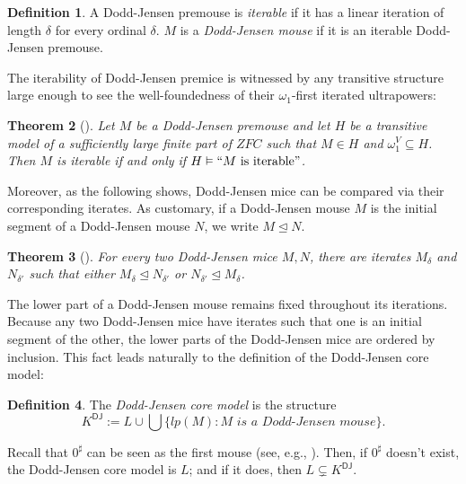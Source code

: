 \documentclass{amsart}
\numberwithin{equation}{section}
\newtheorem{theorem}{Theorem}[section]
\theoremstyle{definition}
\newtheorem{definition}[theorem]{Definition}
\theoremstyle{remark}
\begin{document}
\begin{definition}\label{definition:dj-mouse} A Dodd-Jensen premouse is \emph{iterable} if it has a linear iteration of length $\delta$ for every ordinal $\delta$. $M$ is a \emph{Dodd-Jensen mouse} if it is an iterable Dodd-Jensen premouse.
\end{definition}

The iterability of Dodd-Jensen premice is witnessed by any transitive structure large enough to see the well-foundedness of their $\omega_1$-first iterated ultrapowers:

\begin{theorem}[{\cite[Theorem 2.7]{koepke1988some}}]\label{theorem:iterability-iff-iterability-in-a-large-enough-transitive-model} Let $M$ be a Dodd-Jensen premouse and let $H$ be a transitive model of a sufficiently large finite part of $ZFC$ such that $M\in H$ and $\omega_{1}^{V}\subseteq H$. Then $M$ is iterable if and only if $H\vDash``M \text{ is iterable}"$.
\end{theorem} 

Moreover, as the following shows, Dodd-Jensen mice can be compared via their corresponding iterates. As customary, if a Dodd-Jensen mouse $M$ is the initial segment of a Dodd-Jensen mouse $N$, we write $M\trianglelefteq N$.

\begin{theorem}[{\cite[Theorem 2.12]{koepke1988some}}]\label{theorem:comparison-of-dj-mice} For every two Dodd-Jensen mice $M,N$, there are iterates $M_{\delta}$ and $N_{\delta'}$ such that either $M_{\delta}\trianglelefteq N_{\delta'}$ or $N_{\delta'}\trianglelefteq M_{\delta}$. 
\end{theorem}



The lower part of a Dodd-Jensen mouse remains fixed throughout its iterations. Because any two Dodd-Jensen mice have iterates such that one is an initial segment of the other, the lower parts of the Dodd-Jensen mice are ordered by inclusion. This fact leads naturally to the definition of the Dodd-Jensen core model:

\begin{definition} The \emph{Dodd-Jensen core model} is the structure
	\[
	K^{\mathsf{DJ}}:=L\cup\bigcup\{lp(M):M\textit{ is a Dodd-Jensen mouse}\}.
	\]
\end{definition}

Recall that $0^\sharp$ can be seen as the first mouse (see, e.g., \cite[Lemma 35.7]{Jech}). Then, if $0^{\sharp}$ doesn't exist, the Dodd-Jensen core model is $L$; and if it does, then $L\subsetneq K^{\mathsf{DJ}}$. 
\end{document}
